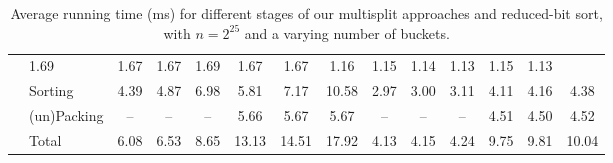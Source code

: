 \begin{table}
\begin{tabular}{p{\runtimefirstcol}lccc|ccc || ccc|ccc}
        & 1.69 & 1.67 & 1.67 & 1.69 & 1.67 & 1.67 
        & 1.16 & 1.15 & 1.14 & 1.13 & 1.15 & 1.13 \\ 
    & Sorting 
        & 4.39 & 4.87 & 6.98 & 5.81 & 7.17 & 10.58 
        & 2.97 & 3.00 & 3.11 & 4.11 & 4.16 & 4.38 \\  
    & (un)Packing 
        & -- & -- & -- & 5.66 & 5.67 & 5.67 
        & -- & -- & -- & 4.51 & 4.50 & 4.52 \\  
    & Total 
        & 6.08 & 6.53 & 8.65 & 13.13 & 14.51 & 17.92
        & 4.13 & 4.15 & 4.24 & 9.75 & 9.81 & 10.04 \\ 
    \bottomrule
  \end{tabular}
  \caption{Average running time (ms) for different stages of our multisplit approaches and reduced-bit sort, with $n=2^{25}$ and a varying number of buckets.}\label{table:timing}
\end{table}
